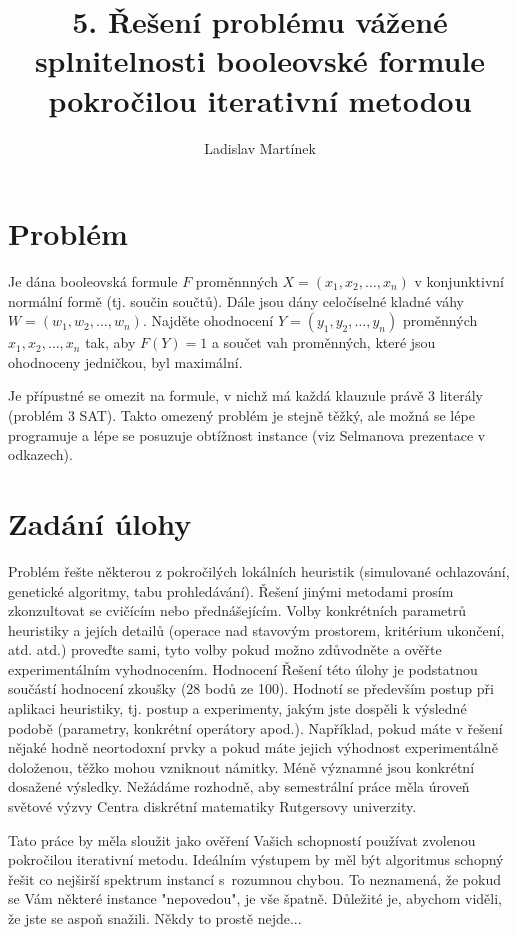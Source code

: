\documentclass[11pt]{article}
\begin{document}

\title{5. Řešení problému vážené splnitelnosti booleovské formule pokročilou iterativní metodou}
\author{Ladislav Martínek}
\date{}
\maketitle
 
\section{Problém} \label{kap:problem}
 Je dána booleovská formule $F$ proměnnných $X=(x_1, x_2, \dots, x_n)$ v konjunktivní normální formě (tj. součin součtů). Dále jsou dány celočíselné kladné váhy $W=(w_1, w_2, \dots, w_n).$ Najděte ohodnocení $Y=(y_1, y_2, \dots, y_n)$ proměnných $x_1, x_2, \dots, x_n$ tak, aby $F(Y)=1$ a součet vah proměnných, které jsou ohodnoceny jedničkou, byl maximální.

Je přípustné se omezit na formule, v nichž má každá klauzule právě 3 literály (problém 3 SAT). Takto omezený problém je stejně těžký, ale možná se lépe programuje a lépe se posuzuje obtížnost instance (viz Selmanova prezentace v odkazech).
 
 
\section{Zadání úlohy} \label{kap:zadani}

Problém řešte některou z pokročilých lokálních heuristik (simulované ochlazování, genetické algoritmy, tabu prohledávání). Řešení jinými metodami prosím zkonzultovat se cvičícím nebo předná\-šejícím. Volby konkrétních parametrů heuristiky a jejích detailů (operace nad stavovým prostorem, kritérium ukončení, atd. atd.) proveďte sami, tyto volby pokud možno zdůvodněte a ověřte experimentálním vyhodnocením. Hodnocení Řešení této úlohy je podstatnou součástí hodnocení zkoušky (28 bodů ze 100). Hodnotí se především postup při aplikaci heuristiky, tj. postup a experimenty, jakým jste dospěli k výsledné podobě (parametry, konkrétní operátory apod.). Například, pokud máte v řešení nějaké hodně neortodoxní prvky a pokud máte jejich výhodnost experimentálně doloženou, těžko mohou vzniknout námitky. Méně významné jsou konkrétní dosažené výsledky. Nežádáme rozhodně, aby semestrální práce měla úroveň světové výzvy Centra diskrétní matematiky Rutgersovy univerzity.

Tato práce by měla sloužit jako ověření Vašich schopností používat zvolenou pokročilou iterativní metodu. Ideálním výstupem by měl být algoritmus schopný řešit co nejširší spektrum instancí s~rozumnou chybou. To neznamená, že pokud se Vám některé instance "nepovedou", je vše špatně. Důležité je, abychom viděli, že jste se aspoň snažili. Někdy to prostě nejde...
\end{document}
